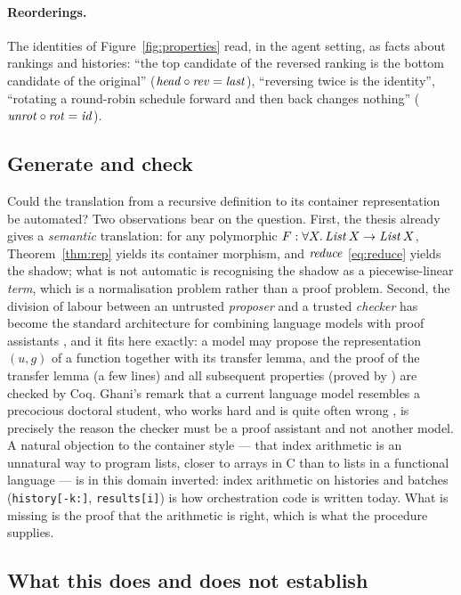 \documentclass{fundam}
\begin{document}
\paragraph{Reorderings.}  The identities of Figure~\ref{fig:properties} read, in the
agent setting, as facts about rankings and histories: ``the top candidate of the reversed
ranking is the bottom candidate of the original'' ($\mathit{head} \circ \mathit{rev} = \mathit{last}$),
``reversing twice is the identity'', ``rotating a round-robin schedule forward and then
back changes nothing'' ($\mathit{unrot} \circ \mathit{rot} = \mathit{id}$).

\subsection{Generate and check}\label{sec:generate-check}

Could the translation from a recursive definition to its container representation be
automated?  Two observations bear on the question.  First, the thesis
\cite[\S7.2.3]{Prince10} already gives a \emph{semantic} translation: for any polymorphic
$F : \forall X.\, \mathit{List}\,X \to \mathit{List}\,X$, Theorem~\ref{thm:rep} yields its container
morphism, and $\mathit{reduce}$ \eqref{eq:reduce} yields the shadow; what is not automatic is
recognising the shadow as a piecewise-linear \emph{term}, which is a normalisation problem
rather than a proof problem.  Second, the division of labour between an untrusted
\emph{proposer} and a trusted \emph{checker} has become the standard architecture for
combining language models with proof assistants \cite{Harmonic25,AlphaProof25}, and it
fits here exactly: a model may propose the representation $(u, g)$ of a function together
with its transfer lemma, and the proof of the transfer lemma (a few lines) and all
subsequent properties (proved by ) are checked by Coq.  Ghani's remark
that a current language model resembles a precocious doctoral student, who works hard
and is quite often wrong \cite{GhaniPodcast26}, is precisely the reason the checker must
be a proof assistant and not another model.  A natural objection to the container
style --- that index arithmetic is an unnatural way to program lists, closer to arrays
in C than to lists in a functional language --- is in this domain inverted: index
arithmetic on histories and batches (\texttt{history[-k:]}, \texttt{results[i]}) is how
orchestration code is written today.  What is missing is the proof that the arithmetic
is right, which is what the procedure supplies.

\subsection{What this does and does not establish}
\end{document}
